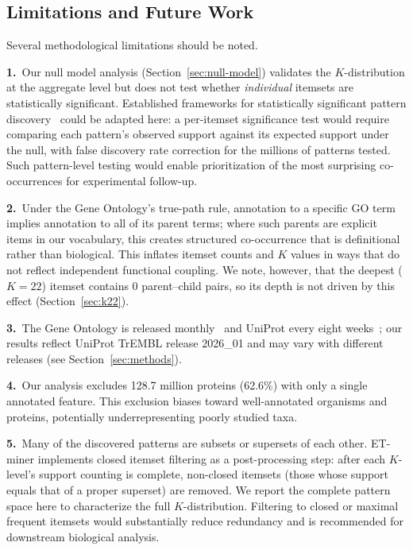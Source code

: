 \documentclass[10pt,a4paper,twocolumn]{article}
\begin{document}
\subsection{Limitations and Future Work}
\label{sec:limitations}

\setlength{\parindent}{0pt}%
Several methodological limitations should be noted.

\textbf{1.}~Our null model analysis (Section~\ref{sec:null-model}) validates the $K$-distribution at the aggregate level but does not test whether \emph{individual} itemsets are statistically significant. Established frameworks for statistically significant pattern discovery~\cite{webb2007,webb2014} could be adapted here: a per-itemset significance test would require comparing each pattern's observed support against its expected support under the null, with false discovery rate correction for the millions of patterns tested. Such pattern-level testing would enable prioritization of the most surprising co-occurrences for experimental follow-up.

\textbf{2.}~Under the Gene Ontology's true-path rule, annotation to a specific GO term implies annotation to all of its parent terms; where such parents are explicit items in our vocabulary, this creates structured co-occurrence that is definitional rather than biological. This inflates itemset counts and $K$ values in ways that do not reflect independent functional coupling. We note, however, that the deepest ($K{=}22$) itemset contains 0 parent--child pairs, so its depth is not driven by this effect (Section~\ref{sec:k22}).

\textbf{3.}~The Gene Ontology is released monthly~\cite{go2023} and UniProt every eight weeks~\cite{uniprot2023}; our results reflect UniProt TrEMBL release 2026\_01 and may vary with different releases (see Section~\ref{sec:methods}).

\textbf{4.}~Our analysis excludes 128.7 million proteins (62.6\%) with only a single annotated feature. This exclusion biases toward well-annotated organisms and proteins, potentially underrepresenting poorly studied taxa.

\textbf{5.}~Many of the discovered patterns are subsets or supersets of each other. ET-miner implements closed itemset filtering as a post-processing step: after each $K$-level's support counting is complete, non-closed itemsets (those whose support equals that of a proper superset) are removed. We report the complete pattern space here to characterize the full $K$-distribution. Filtering to closed or maximal frequent itemsets would substantially reduce redundancy and is recommended for downstream biological analysis.
\end{document}

